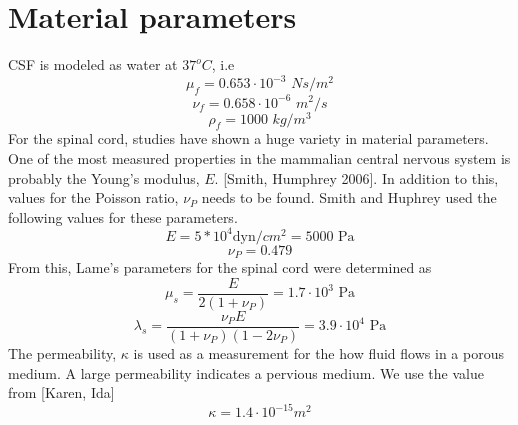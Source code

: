 \section{Material parameters}
CSF is modeled as water at $37^o C$, i.e
\[ \mu_f = 0.653\cdot 10^{-3}\,\, Ns/m^2 \]
\[ \nu_f = 0.658\cdot 10^{-6}\,\, m^2/s \]
\[ \rho_f = 1000\,\,kg/m^3 \]
For the spinal cord, studies have shown a huge variety in material parameters. One of the most measured properties in the mammalian central nervous system is probably the Young's modulus, $E$. [Smith, Humphrey 2006]. In addition to this, values for the Poisson ratio, $\nu_P$ needs to be found. Smith and Huphrey used the following values for these parameters. 
\[ E = 5*10^4 \text{dyn}/cm^2  = 5000 \text{ Pa}\]
\[ \nu_P = 0.479 \]
From this, Lame's parameters for the spinal cord were determined as
\[ \mu_s = \frac{E}{2(1 + \nu_P)} = 1.7 \cdot 10^3 \text{ Pa}\]
\[ \lambda_s = \frac{\nu_P E}{(1 + \nu_P)(1-2\nu_P)} = 3.9 \cdot 10^4 \text{ Pa}\]
The permeability, $\kappa$ is used as a measurement for the how fluid flows in a porous medium. A large permeability indicates a pervious medium. We use the value from [Karen, Ida]
\[ \kappa = 1.4\cdot 10^{-15} m^2 \]
